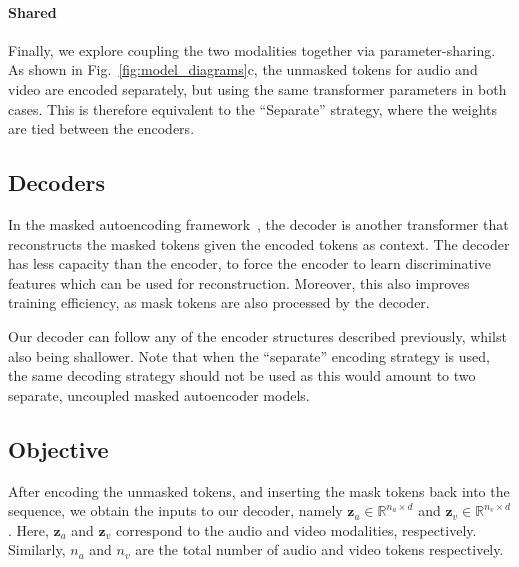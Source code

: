 \documentclass[10pt,twocolumn,letterpaper]{article}
\def \paravspace {-1\baselineskip}
\begin{document}
\vspace{\paravspace}
\paragraph{Shared}
Finally, we explore coupling the two modalities together via parameter-sharing.
As shown in Fig.~\ref{fig:model_diagrams}c, the unmasked tokens for audio and video are encoded separately, but using the same transformer parameters in both cases.
This is therefore equivalent to the ``Separate'' strategy, where the weights are tied between the encoders.

\vspace{-0.15\baselineskip}
\subsection{Decoders}
\label{sec:method_decoders}
\vspace{-1mm}

In the masked autoencoding framework~\cite{he2022masked, feichtenhofer2022masked, bao2021beit}, the decoder is another transformer that reconstructs the masked tokens given the encoded tokens as context.
The decoder has less capacity than the encoder, to force the encoder to learn discriminative features which can be used for reconstruction. Moreover, this  also  improves training efficiency, as mask tokens are also processed by the decoder.

Our decoder can follow any of the encoder structures described previously, whilst also being shallower.
Note that when the ``separate'' encoding strategy is used, the same decoding strategy should not be used as this would amount to two separate, uncoupled masked autoencoder models.

\subsection{Objective} 
\label{sec:method_objective}
\vspace{-1mm}

After encoding the unmasked tokens, and inserting the mask tokens back into the sequence, we obtain the inputs to our decoder, namely $\mathbf{z}_a \in \mathbb{R}^{n_a \times d}$ and $\mathbf{z}_v \in \mathbb{R}^{n_v \times d}$.
Here, $\mathbf{z}_a$ and $\mathbf{z}_v$ correspond to the audio and video modalities, respectively.
Similarly, $n_a$ and $n_v$ are the total number of audio and video tokens respectively.

\vspace{\paravspace}
\end{document}
